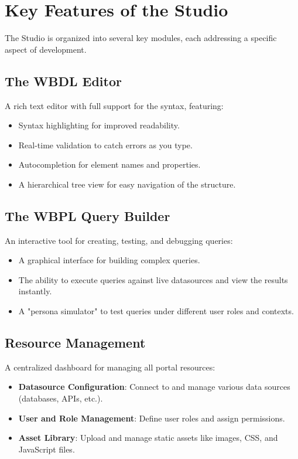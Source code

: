\section{Key Features of the Studio}
\label{sec:studio-features}

The Studio is organized into several key modules, each addressing a specific aspect of \webbase{} development.

\subsection{The WBDL Editor}
A rich text editor with full support for the \wbdl{} syntax, featuring:
\begin{itemize}
    \item Syntax highlighting for improved readability.
    \item Real-time validation to catch errors as you type.
    \item Autocompletion for element names and properties.
    \item A hierarchical tree view for easy navigation of the \webbase{} structure.
\end{itemize}

\subsection{The WBPL Query Builder}
An interactive tool for creating, testing, and debugging \wbpl{} queries:
\begin{itemize}
    \item A graphical interface for building complex queries.
    \item The ability to execute queries against live datasources and view the results instantly.
    \item A "persona simulator" to test queries under different user roles and contexts.
\end{itemize}

\subsection{Resource Management}
A centralized dashboard for managing all portal resources:
\begin{itemize}
    \item \textbf{Datasource Configuration}: Connect to and manage various data sources (databases, APIs, etc.).
    \item \textbf{User and Role Management}: Define user roles and assign permissions.
    \item \textbf{Asset Library}: Upload and manage static assets like images, CSS, and JavaScript files.
\end{itemize}

